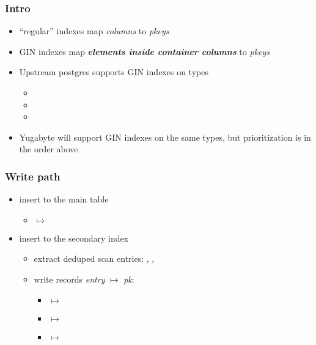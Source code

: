 \begin{frame}
  \titlepage
  \hypertarget{titlePage}{}
\end{frame}

\begin{frame}
  \frametitle{Intro}
  \begin{itemize}
    \item ``regular'' indexes map \emph{columns} to \emph{pkeys}
      \pause
    \item GIN indexes map \textbf{\emph{elements inside container columns}} to
      \emph{pkeys}
      \pause
    \item Upstream postgres supports GIN indexes on types
      \begin{itemize}
        \item {}
        \item {}
        \item {}
      \end{itemize}
      \pause
    \item Yugabyte will support GIN indexes on the same types, but
      prioritization is in the order above
  \end{itemize}
\end{frame}

\begin{frame}
  \frametitle{Write path}

  \pause

  \pause

  \begin{itemize}
    \item insert to the main table
      \pause
      \begin{itemize}
        \item {} $\mapsto$ 
      \end{itemize}
      \pause
    \item insert to the secondary index
      \pause
      \begin{itemize}
        \item extract deduped scan entries: , ,
          \pause
        \item write records \emph{entry} $\mapsto$ \emph{pk}:
          \pause
          \begin{itemize}
            \item {} $\mapsto$ 
              \pause
            \item {} $\mapsto$ 
              \pause
            \item {} $\mapsto$ 
          \end{itemize}
      \end{itemize}
  \end{itemize}
\end{frame}

